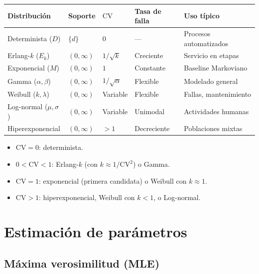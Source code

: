 \documentclass[11pt, letterpaper]{article}
\begin{document}
\begin{center}
\small
\renewcommand{\arraystretch}{1.3}
\begin{tabular}{lllll}
\toprule
\textbf{Distribución} & \textbf{Soporte} & $\text{CV}$ & \textbf{Tasa de falla} & \textbf{Uso típico} \\
\midrule
Determinista ($D$)      & $\{d\}$        & $0$              & ---         & Procesos automatizados \\
Erlang-$k$ ($E_k$)      & $(0,\infty)$   & $1/\sqrt{k}$     & Creciente   & Servicio en etapas \\
Exponencial ($M$)       & $(0,\infty)$   & $1$              & Constante   & Baseline Markoviano \\
Gamma ($\alpha,\beta$)  & $(0,\infty)$   & $1/\sqrt{\alpha}$& Flexible    & Modelado general \\
Weibull ($k,\lambda$)   & $(0,\infty)$   & Variable         & Flexible    & Fallas, mantenimiento \\
Log-normal ($\mu,\sigma$) & $(0,\infty)$ & Variable         & Unimodal    & Actividades humanas \\
Hiperexponencial        & $(0,\infty)$   & $>1$             & Decreciente & Poblaciones mixtas \\
\bottomrule
\end{tabular}
\end{center}

\begin{metodobox}
\begin{itemize}
    \item $\text{CV} = 0$: determinista.
    \item $0 < \text{CV} < 1$: Erlang-$k$ (con $k \approx 1/\text{CV}^2$) o Gamma.
    \item $\text{CV} = 1$: exponencial (primera candidata) o Weibull con $k \approx 1$.
    \item $\text{CV} > 1$: hiperexponencial, Weibull con $k < 1$, o Log-normal.
\end{itemize}
\end{metodobox}

\section{Estimación de parámetros}

\subsection{Máxima verosimilitud (MLE)}
\end{document}
